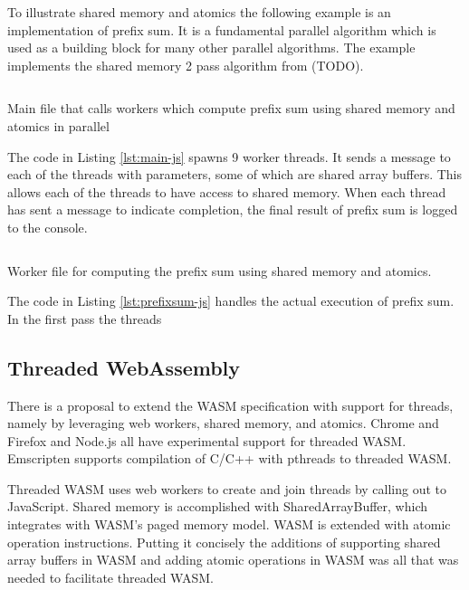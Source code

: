 \documentclass[11pt]{article}
\begin{document}
To illustrate shared memory and atomics the following example is an implementation of prefix sum. It is a fundamental parallel algorithm which is used as a building block for many other parallel algorithms. The example implements the shared memory 2 pass algorithm from (TODO). 
\begin{listing}[H]    
        \inputminted[fontsize=\small,baselinestretch=0.5,linenos]{javascript}{code/shared/main.js}
        \caption{Main file that calls workers which compute prefix sum using shared memory and atomics in parallel}    
        \label{lst:main-js}    
\end{listing}    

The code in Listing \ref{lst:main-js} spawns 9 worker threads. It sends a message to each of the threads with parameters, some of which are shared array buffers. This allows each of the threads to have access to shared memory. When each thread has sent a message to indicate completion, the final result of prefix sum is logged to the console.

\begin{listing}[H]    
\inputminted[fontsize=\small,baselinestretch=0.5,linenos]{javascript}{code/shared/prefix_sum.js}
        \caption{Worker file for computing the prefix sum using shared memory and atomics.}    
        \label{lst:prefixsum-js}    
\end{listing}    

The code in Listing \ref{lst:prefixsum-js} handles the actual execution of prefix sum. In the first pass the threads



\subsection{Threaded WebAssembly}
There is a proposal to extend the WASM specification with support for threads, namely by leveraging web workers, shared memory, and atomics. Chrome and Firefox and Node.js all have experimental support for threaded WASM. Emscripten supports compilation of C/C++ with pthreads to threaded WASM.

Threaded WASM uses web workers to create and join threads by calling out to JavaScript. Shared memory is accomplished with SharedArrayBuffer, which integrates with WASM's paged memory model. WASM is extended with atomic operation instructions. Putting it concisely the additions of supporting shared array buffers in WASM and adding atomic operations in WASM was all that was needed to facilitate threaded WASM.
\end{document}
